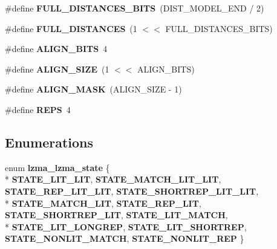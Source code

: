 \begin{DoxyCompactItemize}
\item 
\#define {\bfseries F\-U\-L\-L\-\_\-\-D\-I\-S\-T\-A\-N\-C\-E\-S\-\_\-\-B\-I\-T\-S}~(D\-I\-S\-T\-\_\-\-M\-O\-D\-E\-L\-\_\-\-E\-N\-D / 2)\label{lzma__common_8h_a02121326061ce76c4f1f2119f90bcd39}

\item 
\#define {\bfseries F\-U\-L\-L\-\_\-\-D\-I\-S\-T\-A\-N\-C\-E\-S}~(1 $<$$<$ F\-U\-L\-L\-\_\-\-D\-I\-S\-T\-A\-N\-C\-E\-S\-\_\-\-B\-I\-T\-S)\label{lzma__common_8h_a638ba3ec1c265efcd7bb1812534186f6}

\item 
\#define {\bfseries A\-L\-I\-G\-N\-\_\-\-B\-I\-T\-S}~4\label{lzma__common_8h_a2ae9aed5395d2113810e0c5067064605}

\item 
\#define {\bfseries A\-L\-I\-G\-N\-\_\-\-S\-I\-Z\-E}~(1 $<$$<$ A\-L\-I\-G\-N\-\_\-\-B\-I\-T\-S)\label{lzma__common_8h_a65d1ea18e1cbfa27d9d1952f05e31e60}

\item 
\#define {\bfseries A\-L\-I\-G\-N\-\_\-\-M\-A\-S\-K}~(A\-L\-I\-G\-N\-\_\-\-S\-I\-Z\-E -\/ 1)\label{lzma__common_8h_a9acfa53ba535d32d76682f5d3e893c05}

\item 
\#define {\bfseries R\-E\-P\-S}~4\label{lzma__common_8h_a28973becc878febad71571123f7df2c9}

\end{DoxyCompactItemize}
\subsection*{Enumerations}
\begin{DoxyCompactItemize}
\item 
enum {\bf lzma\-\_\-lzma\-\_\-state} \{ \\*
{\bfseries S\-T\-A\-T\-E\-\_\-\-L\-I\-T\-\_\-\-L\-I\-T}, 
{\bfseries S\-T\-A\-T\-E\-\_\-\-M\-A\-T\-C\-H\-\_\-\-L\-I\-T\-\_\-\-L\-I\-T}, 
{\bfseries S\-T\-A\-T\-E\-\_\-\-R\-E\-P\-\_\-\-L\-I\-T\-\_\-\-L\-I\-T}, 
{\bfseries S\-T\-A\-T\-E\-\_\-\-S\-H\-O\-R\-T\-R\-E\-P\-\_\-\-L\-I\-T\-\_\-\-L\-I\-T}, 
\\*
{\bfseries S\-T\-A\-T\-E\-\_\-\-M\-A\-T\-C\-H\-\_\-\-L\-I\-T}, 
{\bfseries S\-T\-A\-T\-E\-\_\-\-R\-E\-P\-\_\-\-L\-I\-T}, 
{\bfseries S\-T\-A\-T\-E\-\_\-\-S\-H\-O\-R\-T\-R\-E\-P\-\_\-\-L\-I\-T}, 
{\bfseries S\-T\-A\-T\-E\-\_\-\-L\-I\-T\-\_\-\-M\-A\-T\-C\-H}, 
\\*
{\bfseries S\-T\-A\-T\-E\-\_\-\-L\-I\-T\-\_\-\-L\-O\-N\-G\-R\-E\-P}, 
{\bfseries S\-T\-A\-T\-E\-\_\-\-L\-I\-T\-\_\-\-S\-H\-O\-R\-T\-R\-E\-P}, 
{\bfseries S\-T\-A\-T\-E\-\_\-\-N\-O\-N\-L\-I\-T\-\_\-\-M\-A\-T\-C\-H}, 
{\bfseries S\-T\-A\-T\-E\-\_\-\-N\-O\-N\-L\-I\-T\-\_\-\-R\-E\-P}
 \}
\end{DoxyCompactItemize}
